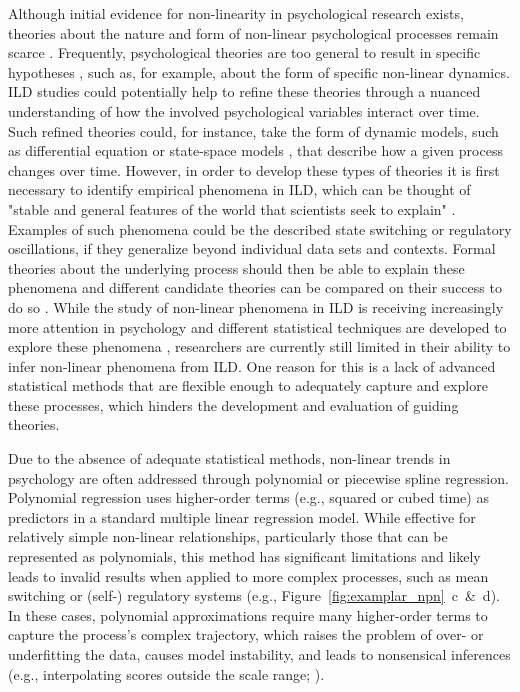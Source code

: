 \documentclass[man, floatsintext]{apa7}
\begin{document}
Although initial evidence for non-linearity in psychological research exists,
theories about the nature and form of non-linear psychological processes remain
scarce \parencite{tan_time-varying_2011}. Frequently, psychological theories
are too general to result in specific hypotheses
\parencite{oberauer_addressing_2019}, such as, for example, about the form of
specific non-linear dynamics. ILD studies could potentially help to refine
these theories through a nuanced understanding of how the involved
psychological variables interact over time. Such refined theories could, for
instance, take the form of dynamic models, such as differential equation
\parencite{cooper_dynamical_2012} or state-space models
\parencite{durbin_time_2012}, that describe how a given process changes over
time. However, in order to develop these types of theories it is first
necessary to identify empirical phenomena in ILD, which can be thought of
"stable and general features of the world that scientists seek to explain"
\parencite{borsboom_theory_2021}. Examples of such phenomena could be the
described state switching or regulatory oscillations, if they generalize beyond
individual data sets and contexts. Formal theories about the underlying process
should then be able to explain these phenomena and different candidate theories
can be compared on their success to do so \parencite{borsboom_theory_2021}.
While the study of non-linear phenomena in ILD is receiving increasingly more
attention in psychology and different statistical techniques are developed to
explore these phenomena \parencite{cui_unlocking_2023,humberg_estimating_2024},
researchers are currently still limited in their ability to infer non-linear
phenomena from ILD\@. One reason for this is a lack of advanced statistical
methods that are flexible enough to adequately capture and explore these
processes, which hinders the development and evaluation of guiding theories.

Due to the absence of adequate statistical methods, non-linear trends in
psychology are often addressed through polynomial or piecewise spline
regression. Polynomial regression \parencite{jebb_time_2015} uses higher-order
terms (e.g., squared or cubed time) as predictors in a standard multiple linear
regression model. While effective for relatively simple non-linear
relationships, particularly those that can be represented as polynomials, this
method has significant limitations and likely leads to invalid results when
applied to more complex processes, such as mean switching or (self-) regulatory
systems (e.g., Figure~\ref{fig:examplar_npn}~c~\&~d). In these cases,
polynomial approximations require many higher-order terms to capture the
process's complex trajectory, which raises the problem of over- or underfitting
the data, causes model instability, and leads to nonsensical inferences (e.g.,
interpolating scores outside the scale range;
\textcite{boyd_divergence_2009,harrell_general_2001,jianan_case_2023}).
\end{document}

